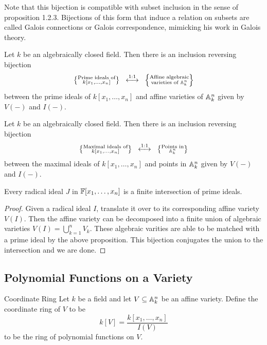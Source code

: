 \documentclass[a4paper]{article}
\begin{document}
Note that this bijection is compatible with subset inclusion in the sense of proposition 1.2.3. Bijections of this form that induce a relation on subsets are called Galois connections or Galois correspondence, mimicking his work in Galois theory. 

\begin{crl}{}{} Let $k$ be an algebraically closed field. Then there is an inclusion reversing bijection $$\left\{\substack{\text{Prime ideals of}\\ k[x_1,\dots,x_n]}\right\}\;\;\overset{\text{1:1}}{\longleftrightarrow}\;\;\left\{\substack{\text{Affine algebraic}\\\text{varieties of }\mathbb{A}_k^n}\right\}$$ between the prime ideals of $k[x_1,\dots,x_n]$ and affine varieties of $\mathbb{A}_k^n$ given by $V(-)$ and $I(-)$. 
\end{crl}

\begin{crl}{}{} Let $k$ be an algebraically closed field. Then there is an inclusion reversing bijection $$\left\{\substack{\text{Maximal ideals of}\\ k[x_1,\dots,x_n]}\right\}\;\;\overset{\text{1:1}}{\longleftrightarrow}\;\;\left\{\substack{\text{Points in}\\\mathbb{A}_k^n}\right\}$$ between the maximal ideals of $k[x_1,\dots,x_n]$ and points in $\mathbb{A}_k^n$ given by $V(-)$ and $I(-)$. 
\end{crl}

\begin{prp}{}{} Every radical ideal $J$ in $\mathbb{F}[x_1,\dots,x_n]$ is a finite intersection of prime ideals. \tcbline
\begin{proof}
Given a radical ideal $I$, translate it over to its corresponding affine variety $V(I)$. Then the affine variety can be decomposed into a finite union of algebraic varieties $V(I)=\bigcup_{k=1}^nV_k$. These algebraic varities are able to be matched with a prime ideal by the above proposition. This bijection conjugates the union to the intersection and we are done. 
\end{proof}
\end{prp}

\subsection{Polynomial Functions on a Variety}
\begin{defn}{Coordinate Ring}{} Let $k$ be a field and let $V\subseteq\mathbb{A}_k^n$ be an affine variety. Define the coordinate ring of $V$ to be $$k[V]=\frac{k[x_1,\dots,x_n]}{I(V)}$$ to be the ring of polynomial functions on $V$. 
\end{defn}
\end{document}
